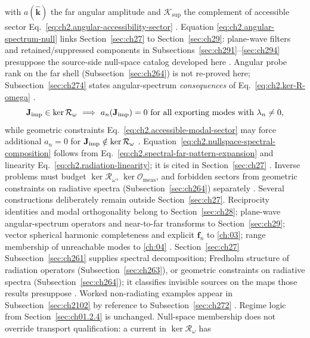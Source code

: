 with \(a(\widehat{\mathbf{k}})\) the far angular amplitude and
\(\mathcal{K}_{\mathrm{sup}}\) the complement of accessible sector
Eq.~\eqref{eq:ch2.angular-accessibility-sector} \cite{stratton1941}. Equation
\eqref{eq:ch2.angular-spectrum-null} links Section~\ref{sec:ch27} to
Section~\ref{sec:ch29}: plane-wave filters and retained/suppressed components in
Subsections~\ref{sec:ch291}--\ref{sec:ch294} presuppose the
source-side null-space catalog developed here \cite{stratton1941}. Angular probe rank on the far shell (Subsection~\ref{sec:ch264}) is not re-proved here;
Subsection~\ref{sec:ch274} states angular-spectrum \emph{consequences} of
Eq.~\eqref{eq:ch2.ker-R-omega} \cite{harrington2001}.
\begin{equation}
\label{eq:ch2.nullspace-spectral-composition}
\mathbf{J}_{\mathrm{imp}}\in\ker\mathcal{R}_\omega
\ \Longrightarrow\
a_n(\mathbf{J}_{\mathrm{imp}})=0\ \text{for all exporting modes with}\ \lambda_n\neq 0,
\end{equation}
while geometric constraints Eq.~\eqref{eq:ch2.accessible-modal-sector} may force additional
\(a_n=0\) for \(\mathbf{J}_{\mathrm{imp}}\notin\ker\mathcal{R}_\omega\) \cite{stratton1941}.
Equation~\eqref{eq:ch2.nullspace-spectral-composition} follows from
Eq.~\eqref{eq:ch2.spectral-far-pattern-expansion} and linearity
Eq.~\eqref{eq:ch2.radiation-linearity}; it is cited in Section~\ref{sec:ch27}
\cite{stratton1941}. Inverse problems must budget \(\ker\mathcal{R}_\omega\),
\(\ker\mathcal{O}_{\mathrm{meas}}\), and forbidden sectors from
geometric constraints on radiative spectra (Subsection~\ref{sec:ch264}) separately
\cite{harrington2001}.
Several constructions deliberately remain outside Section~\ref{sec:ch27}. Reciprocity
identities and modal orthogonality belong to Section~\ref{sec:ch28}; plane-wave angular-spectrum
operators and near-to-far transforms to Section~\ref{sec:ch29}; vector spherical harmonic
completeness and explicit \(\mathbf{f}_n\) to \ref{ch:03}; range membership of
unreachable modes to \ref{ch:04} \cite{stratton1941}. Section~\ref{sec:ch27}
Subsection~\ref{sec:ch261} supplies spectral decomposition;
Fredholm structure of radiation operators (Subsection~\ref{sec:ch263}), or geometric constraints
on radiative spectra (Subsection~\ref{sec:ch264}); it classifies invisible sources on the
maps those results presuppose \cite{stratton1941}. Worked non-radiating examples appear
in Subsection~\ref{sec:ch2102} by reference to Subsection~\ref{sec:ch272}
\cite{harrington2001}.
Regime logic from Section~\ref{sec:ch01.2.4} is unchanged. Null-space membership does not
override transport qualification: a current in \(\ker\mathcal{R}_\omega\) has
